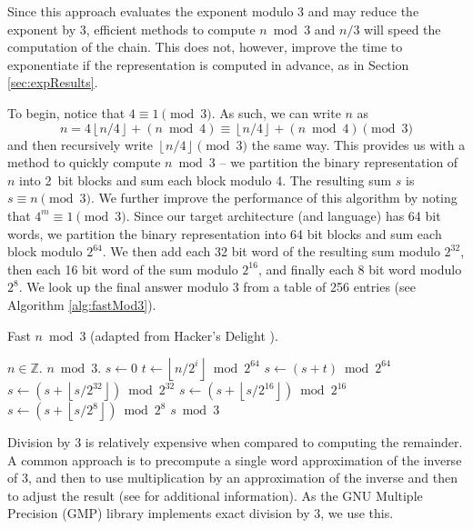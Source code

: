 \documentclass{ucalgthes1}
\theoremstyle{definition}
\newcommand{\ZZ}{\mathbb{Z}}
\newcommand{\floor}[1]{\left\lfloor #1 \right\rfloor}
\begin{document}
Since this approach evaluates the exponent modulo 3 and may reduce the exponent by 3, efficient methods to compute $n \bmod 3$ and $n/3$ will speed the computation of the chain.  This does not, however, improve the time to exponentiate if the representation is computed in advance, as in Section \ref{sec:expResults}.

To begin, notice that $4 \equiv 1 \pmod 3$.  As such, we can write $n$ as
\[
n = 4 \floor{n/4} + (n \bmod 4) \equiv \floor{n/4} + (n \bmod 4) \pmod 3
\]
and then recursively write $\floor{n/4} \pmod 3$ the same way. This provides us with a method to quickly compute $n \bmod 3$ -- we partition the binary representation of $n$ into \mbox{2 bit} blocks and sum each block modulo 4.  The resulting sum $s$ is $s \equiv n \pmod 3$.  We further improve the performance of this algorithm by noting that $4^m \equiv 1 \pmod 3$.  Since our target architecture (and language) has 64 bit words, we partition the binary representation into 64 bit blocks and sum each block modulo $2^{64}$.  We then add each 32 bit word of the resulting sum modulo $2^{32}$, then each 16 bit word of the sum modulo $2^{16}$, and finally each 8 bit word modulo $2^8$.  We look up the final answer modulo 3 from a table of 256 entries (see Algorithm \ref{alg:fastMod3}).

\begin{algorithm}[htb]
\caption{Fast $n \bmod 3$ (adapted from Hacker's Delight \cite{Warren2002}).}
\label{alg:fastMod3}
\begin{algorithmic}[1]
\Require $n \in \ZZ$.
\Ensure $n \bmod 3$.
\State $s \gets 0$
\For {$i$ from $0$ to $\floor{\log_2 n}$ by 64}
	\State $t \gets \floor{n / 2^i} \bmod {2^{64}}$
	\State $s \gets (s + t) \bmod {2^{64}}$
\EndFor
\State $s \gets \left(s + \floor{s/{2^{32}}} \right) \bmod {2^{32}}$
\State $s \gets \left(s + \floor{s/{2^{16}}} \right) \bmod {2^{16}}$
\State $s \gets \left(s + \floor{s/{2^{8}}} \right) \bmod {2^{8}}$
\State \Return $s \bmod 3$ 
\end{algorithmic}
\end{algorithm}

Division by 3 is relatively expensive when compared to computing the remainder.  A common approach is to precompute a single word approximation of the inverse of 3, and then to use multiplication by an approximation of the inverse and then to adjust the result (see \cite{Granlund1994,Warren2002,Moller2011} for additional information).  As the GNU Multiple Precision (GMP) library implements exact division by 3, we use this.
\end{document}
